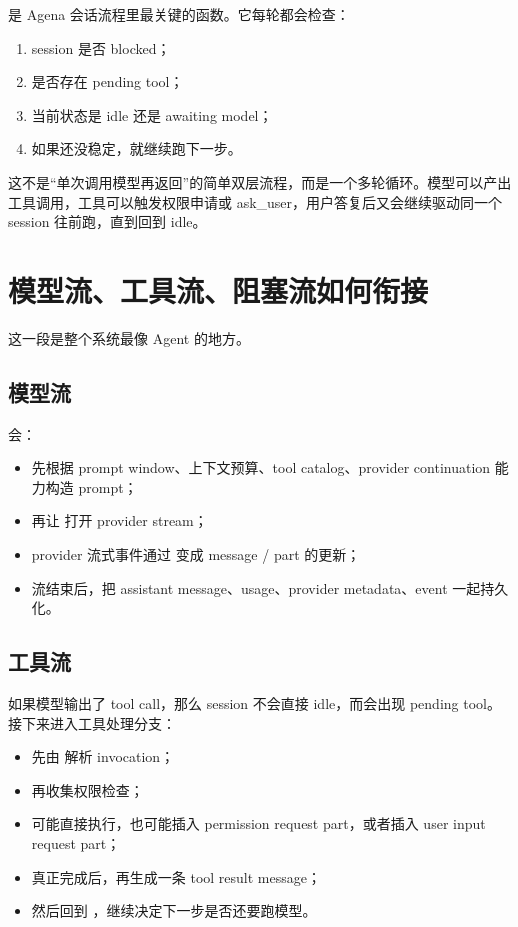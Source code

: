 \documentclass[11pt,a4paper]{ctexart}
\begin{document}
 是 Agena 会话流程里最关键的函数。它每轮都会检查：

\begin{enumerate}
  \item session 是否 blocked；
  \item 是否存在 pending tool；
  \item 当前状态是 idle 还是 awaiting model；
  \item 如果还没稳定，就继续跑下一步。
\end{enumerate}

\begin{notebox}[把它想成一个状态机]
这不是“单次调用模型再返回”的简单双层流程，而是一个多轮循环。模型可以产出工具调用，工具可以触发权限申请或 ask\_user，用户答复后又会继续驱动同一个 session 往前跑，直到回到 idle。
\end{notebox}

\section{模型流、工具流、阻塞流如何衔接}

这一段是整个系统最像 Agent 的地方。

\subsection{模型流}

 会：

\begin{itemize}
  \item 先根据 prompt window、上下文预算、tool catalog、provider continuation 能力构造 prompt；
  \item 再让  打开 provider stream；
  \item provider 流式事件通过  变成 message / part 的更新；
  \item 流结束后，把 assistant message、usage、provider metadata、event 一起持久化。
\end{itemize}

\subsection{工具流}

如果模型输出了 tool call，那么 session 不会直接 idle，而会出现 pending tool。接下来进入工具处理分支：

\begin{itemize}
  \item 先由  解析 invocation；
  \item 再收集权限检查；
  \item 可能直接执行，也可能插入 permission request part，或者插入 user input request part；
  \item 真正完成后，再生成一条 tool result message；
  \item 然后回到 ，继续决定下一步是否还要跑模型。
\end{itemize}
\end{document}
